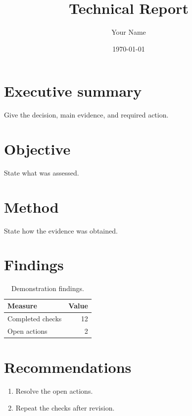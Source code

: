 \documentclass{article}
\title{Technical Report}
\author{Your Name}
\date{\today}
\begin{document}
\maketitle

\section*{Executive summary}
Give the decision, main evidence, and required action.

\section{Objective}
State what was assessed.

\section{Method}
State how the evidence was obtained.

\section{Findings}
\begin{table}[htbp]
  \centering
  \caption{Demonstration findings.}
  \begin{tabular}{lr}
    \toprule
    Measure & Value \\
    \midrule
    Completed checks & 12 \\
    Open actions & 2 \\
    \bottomrule
  \end{tabular}
\end{table}

\section{Recommendations}
\begin{enumerate}
  \item Resolve the open actions.
  \item Repeat the checks after revision.
\end{enumerate}
\end{document}
